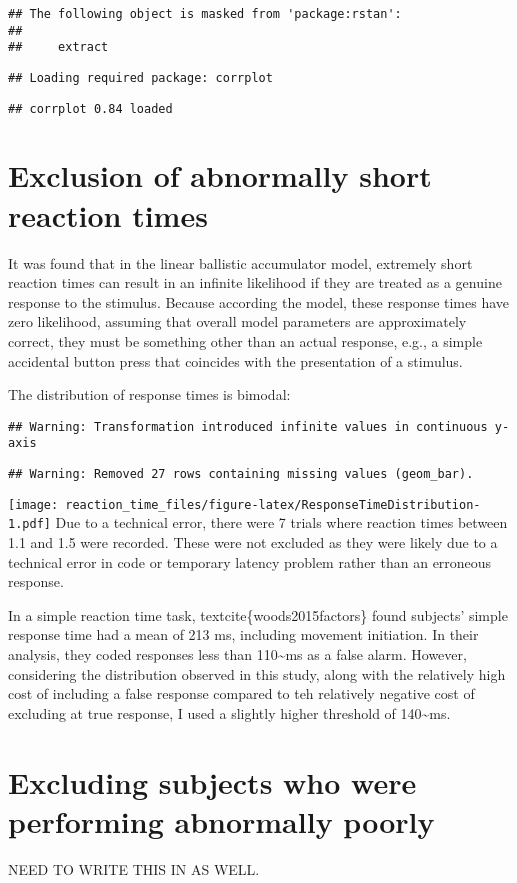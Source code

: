 \documentclass[]{article}
\begin{document}
\begin{verbatim}
## The following object is masked from 'package:rstan':
## 
##     extract
\end{verbatim}

\begin{verbatim}
## Loading required package: corrplot
\end{verbatim}

\begin{verbatim}
## corrplot 0.84 loaded
\end{verbatim}

\section{Exclusion of abnormally short reaction
times}\label{exclusion-of-abnormally-short-reaction-times}

It was found that in the linear ballistic accumulator model, extremely
short reaction times can result in an infinite likelihood if they are
treated as a genuine response to the stimulus. Because according the
model, these response times have zero likelihood, assuming that overall
model parameters are approximately correct, they must be something other
than an actual response, e.g., a simple accidental button press that
coincides with the presentation of a stimulus.

The distribution of response times is bimodal:

\begin{verbatim}
## Warning: Transformation introduced infinite values in continuous y-axis
\end{verbatim}

\begin{verbatim}
## Warning: Removed 27 rows containing missing values (geom_bar).
\end{verbatim}

\texttt{[image: reaction\_time\_files/figure-latex/ResponseTimeDistribution-1.pdf]}
Due to a technical error, there were 7 trials where reaction times
between 1.1 and 1.5 were recorded. These were not excluded as they were
likely due to a technical error in code or temporary latency problem
rather than an erroneous response.

In a simple reaction time task, textcite\{woods2015factors\} found
subjects' simple response time had a mean of 213 ms, including movement
initiation. In their analysis, they coded responses less than
110\textasciitilde{}ms as a false alarm. However, considering the
distribution observed in this study, along with the relatively high cost
of including a false response compared to teh relatively negative cost
of excluding at true response, I used a slightly higher threshold of
140\textasciitilde{}ms.

\section{Excluding subjects who were performing abnormally
poorly}\label{excluding-subjects-who-were-performing-abnormally-poorly}

NEED TO WRITE THIS IN AS WELL.
\end{document}

